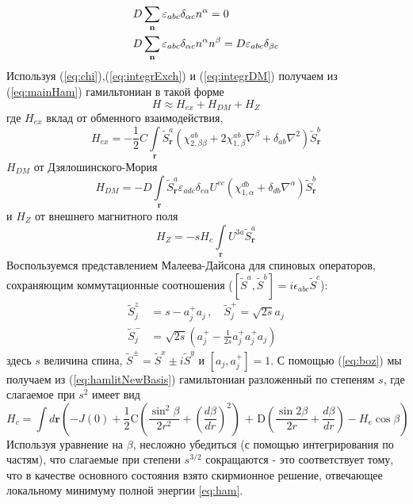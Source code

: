 \documentclass[a4paper,article,14pt]{extarticle}
\begin{document}
\begin{eqnarray}
\label{eq:integrDM}
\begin{gathered}
  D\sum\limits_{\mathbf{n}} {{\varepsilon _{abc}}{\delta _{\alpha c}}{n^\alpha }}  = 0 \hfill \\
  D\sum\limits_{\mathbf{n}} {{\varepsilon _{abc}}{\delta _{\alpha c}}{n^\alpha }{n^\beta }}  = D{\varepsilon _{abc}}{\delta _{\beta c}} \hfill \\ 
\end{gathered}
\end{eqnarray}
Используя (\ref{eq:chi}),(\ref{eq:integrExch}) и (\ref{eq:integrDM}) получаем из (\ref{eq:mainHam}) гамильтониан в такой форме
\begin{equation}
\label{eq:hamlitNewBasis}
H \approx {H_{ex}} + {H_{DM}} + {H_Z}
\end{equation}
где $H_{ex}$ вклад от обменного взаимодействия,
\[{H_{ex}} =  - \frac{1}{2}C\int\limits_{\mathbf{r}} {\tilde S_{\mathbf{r}}^a\left( {\chi _{2,\beta \beta }^{ab} + 2\chi _{1,\beta }^{ab}{\nabla ^\beta } + {\delta _{ab}} \nabla ^ 2 } \right)\tilde S_{\mathbf{r}}^b} \]
$H_{DM}$ от Дзялошинского-Мория
\[{H_{DM}} =  - D\int\limits_{\mathbf{r}} {\tilde S_{\mathbf{r}}^a{\varepsilon _{adc}}{\delta _{e\alpha }}{U^{ec}}\left( {\chi _{1,\alpha }^{db} + {\delta _{db}}{\nabla ^\alpha }} \right)\tilde S_{\mathbf{r}}^b} \]
и $H_Z$ от внешнего магнитного поля 
\[{H_Z} =  - s H_e \int\limits_{\mathbf{r}} {{U^{3a}}\tilde S_{\mathbf{r}}^a} \]
Воспользуемся представлением Малеева-Дайсона для спиновых операторов, сохраняющим коммутационные соотношения  ($[\tilde{S}^a,\tilde{S}^b] = i \epsilon_{abc}\tilde{S}^c$):
\begin{equation} 
\begin{aligned} 
\label{eq:boz}
     \tilde{S}^{z}_{j} &=s-a^+_{ j} a_{ j} \,, \quad   
       \tilde{S}^{+}_{j}=\sqrt{2s}a_{ j}  \\
     \tilde{S}^{-}_{j} &=\sqrt{2s}\left( a^{+}_{ j} - \frac{1}{2s}a^+_{ j}a^{+}_{ j}a_{ j} \right)
  \end{aligned}  
 \end{equation} 
здесь $s$ величина спина,  $\tilde S^{\pm} = \tilde S^{x} \pm i \tilde S^{y}$ и $[a_{ j},a^+_{ j}] = 1$.  
С помощью (\ref{eq:boz}) мы получаем из (\ref{eq:hamlitNewBasis}) гамильтониан разложенный по степеням $s$, где слагаемое при $s^2$ имеет вид
\begin{equation}
\label{eq:cls_skx_eng}
{H_c} = \int {d\mathbf{r} \left( {-J\left( 0 \right) + \frac{1}{2}{\text{C}}\left( {\frac{{{{\sin }^2}\beta }}{{2{r^2}}} + {{\left( {\frac{{d\beta }}{{dr}}} \right)}^2}} \right){\text{ + D}}\left( {\frac{{\sin 2\beta }}{{2r}} + \frac{{d\beta }}{{dr}}} \right) - H_e \cos \beta } \right)}
\end{equation} 
Используя уравнение на $\beta$, несложно убедиться (с помощью интегрирования по частям), что слагаемые при степени $s^{3/2}$ сокращаются - это соответствует тому, что в качестве основного состояния взято скирмионное решение, отвечающее локальному минимуму полной энергии \eqref{eq:ham}. 
\end{document}

